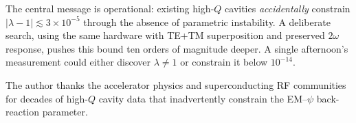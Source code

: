 \documentclass[12pt,aps,prd,twocolumn,superscriptaddress,nofootinbib]{revtex4-2}
\begin{document}
The central message is operational: existing high-$Q$ cavities
\emph{accidentally} constrain $|\lambda - 1| \lesssim 3\times 10^{-5}$
through the absence of parametric instability.  A deliberate search,
using the same hardware with TE+TM superposition and preserved $2\omega$
response, pushes this bound ten orders of magnitude deeper.  A single
afternoon's measurement could either discover $\lambda \neq 1$ or
constrain it below $10^{-14}$.

\begin{acknowledgments}
The author thanks the accelerator physics and superconducting RF
communities for decades of high-$Q$ cavity data that inadvertently
constrain the EM--$\psi$ back-reaction parameter.
\end{acknowledgments}
\end{document}
